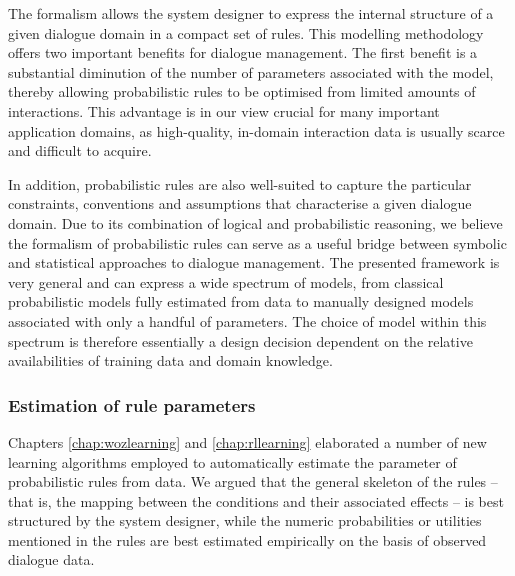 The formalism allows the system designer to express the internal structure of a given dialogue domain in a compact set of rules. This modelling methodology offers two important benefits for dialogue management.  The first benefit is a substantial diminution of the number of parameters associated with the model, thereby allowing probabilistic rules to be optimised from limited amounts of interactions. This advantage is in our view crucial for many important application domains, as high-quality, in-domain interaction data is usually scarce and difficult to acquire.

In addition, probabilistic rules are also well-suited to capture the particular constraints, conventions and assumptions that characterise a given dialogue domain.  Due to its combination of logical and probabilistic reasoning, we believe the formalism of probabilistic rules can serve as a useful bridge between symbolic and statistical approaches to dialogue management.  The presented framework is very general and can express a wide spectrum of models, from classical probabilistic models fully estimated from data to manually designed models associated with only a handful of parameters. The choice of model within this spectrum is therefore essentially a design decision dependent on the relative availabilities of training data and domain knowledge.


\subsubsection*{Estimation of rule parameters}

Chapters \ref{chap:wozlearning} and \ref{chap:rllearning} elaborated a number of new learning algorithms employed to automatically estimate the parameter of probabilistic rules from data. We argued that the general skeleton of the rules -- that is, the mapping between the conditions and their associated effects -- is best structured by the system designer, while the numeric probabilities or utilities mentioned in the rules are best estimated empirically on the basis of observed dialogue data. 

